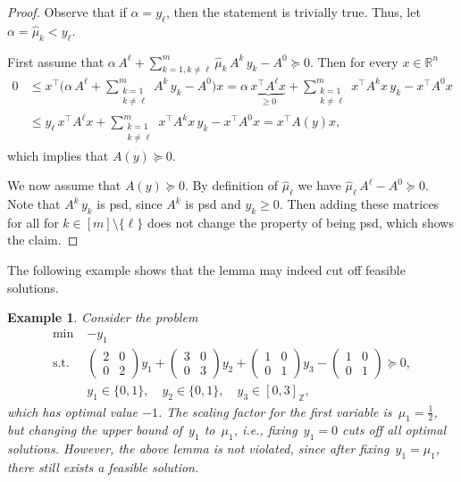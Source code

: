 \documentclass[10pt, a4paper]{article}
\newcommand{\T}{^{\top}}
\newcommand{\R}{\mathds{R}}
\newcommand{\Z}{\mathds{Z}}
\newtheorem{example}[theorem]{Example}
\begin{document}
\begin{proof}
  Observe that if $\alpha = y_{\ell}$, then the statement is trivially
  true. Thus, let $\alpha = \hat{\mu}_k < y_{\ell}$.

  First assume that
  $\alpha\, A^{\ell} + \sum_{k=1,k \neq \ell}^m \hat{\mu}_k\, A^k\, y_k - A^0
  \succeq 0$.  Then for every $x \in \R^n$
  \begin{align*}
    0 & \leq x\T \bigg(\alpha\, A^{\ell} + \sum_{\substack{k=1\\k \neq \ell}}^m A^k\, y_k - A^0\bigg) x =
        \alpha\, \underbrace{x\T A^{\ell} x}_{\geq 0} + \sum_{\substack{k=1\\k \neq \ell}}^m x\T A^k
        x\, y_k - x\T A^0 x\\
      & \leq y_{\ell}\, x\T A^{\ell} x + \sum_{\substack{k=1\\k \neq \ell}}^m x\T A^k x\, y_k - x\T A^0 x
        = x\T A(y)x,
  \end{align*}
  which implies that $A(y) \succeq 0$.

  We now assume that $A(y) \succeq 0$. By definition of $\hat{\mu}_{\ell}$
  we have $\hat{\mu}_{\ell}\, A^{\ell} - A^0 \succeq 0$. Note that
  $A^k \, y_k$ is psd, since $A^k$ is psd and $y_k \geq 0$. Then adding
  these matrices for all for $k \in [m] \setminus \{\ell\}$ does not change
  the property of being psd, which shows the claim.
\end{proof}

The following example shows that the lemma may indeed cut off feasible
solutions.

\begin{example}
  Consider the problem
  \begin{align*}
    \min\; &-y_1 \\
    \text{s.t.}\; &
    \begin{pmatrix} 2 & 0 \\ 0 & 2 \end{pmatrix} y_1
    + \begin{pmatrix} 3 & 0 \\ 0 & 3 \end{pmatrix} y_2
    + \begin{pmatrix} 1 & 0 \\ 0 & 1 \end{pmatrix} y_3
    - \begin{pmatrix} 1 & 0 \\ 0 & 1 \end{pmatrix} \succeq 0, \\
    & y_1 \in \{0,1\},\quad y_2 \in \{0,1\}, \quad y_3 \in [0,3]_\Z,
  \end{align*}
  which has optimal value $-1$. The scaling factor for the first variable
  is~$\mu_1 = \frac{1}{2}$, but changing the upper bound of~$y_1$
  to~$\mu_1$, i.e., fixing~$y_1 = 0$ cuts off all optimal
  solutions. However, the above lemma is not violated, since after
  fixing~$y_1 = \mu_1$, there still exists a feasible solution.
\end{example}
\end{document}
